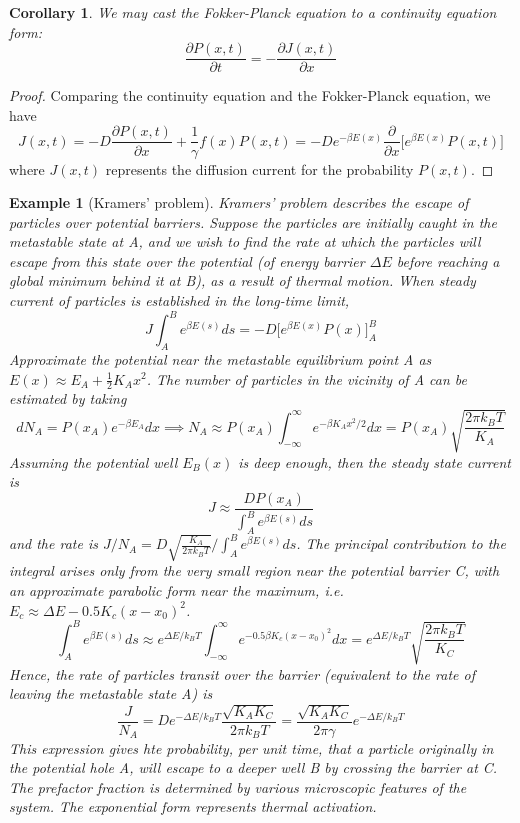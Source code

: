 \documentclass[a4paper]{article}
\newtheorem{eg}{Example}[section]
\theoremstyle{new}
\newtheorem{cor}{Corollary}[section]
\begin{document}
\begin{cor}
We may cast the Fokker-Planck equation to a continuity equation form:
$$\frac{\partial P(x,t)}{\partial t}=-\frac{\partial J(x,t)}{\partial x}$$
\end{cor}
\begin{proof}
Comparing the continuity equation and the Fokker-Planck equation, we have
$$J(x,t)=-D\frac{\partial P(x,t)}{\partial x}+\frac{1}{\gamma}f(x)P(x,t)=-De^{-\beta E(x)}\frac{\partial}{\partial x}\bigg[e^{\beta E(x)}P(x,t)\bigg]$$
where $J(x,t)$ represents the diffusion current for the probability $P(x,t)$.
\end{proof}
\begin{eg}[Kramers' problem]
Kramers' problem describes the escape of particles over potential barriers. Suppose the particles are initially caught in the metastable state at A, and we wish to find the rate at which the particles will escape from this state over the potential (of energy barrier $\Delta E$ before reaching a global minimum behind it at B), as a result of thermal motion. When steady current of particles is established in the long-time limit,
$$J\int_A^Be^{\beta E(s)}ds=-D\bigg[e^{\beta E(x)}P(x)\bigg]_A^B$$
Approximate the potential near the metastable equilibrium point A as $E(x)\approx E_A+\frac{1}{2}K_Ax^2$. The number of particles in the vicinity of A can be estimated by taking
$$dN_A=P(x_A)e^{-\beta E_A}dx\implies N_A\approx P(x_A)\int_{-\infty}^\infty e^{-\beta K_Ax^2/2}dx=P(x_A)\sqrt{\frac{2\pi k_BT}{K_A}}$$
Assuming the potential well $E_B(x)$ is deep enough, then the steady state current is
$$J\approx\frac{DP(x_A)}{\int_A^Be^{\beta E(s)}ds}$$
and the rate is $J/N_A=D\sqrt{\frac{K_A}{2\pi k_BT}}/\int_A^Be^{\beta E(s)}ds$. The principal contribution to the integral arises only from the very small region near the potential barrier C, with an approximate parabolic form near the maximum, i.e. $E_c\approx\Delta E-0.5K_c(x-x_0)^2$.
$$\int_A^Be^{\beta E(s)}ds\approx e^{\Delta E/k_BT}\int_{-\infty}^\infty e^{-0.5\beta K_c(x-x_0)^2}dx=e^{\Delta E/k_BT}\sqrt{\frac{2\pi k_BT}{K_C}}$$
Hence, the rate of particles transit over the barrier (equivalent to the rate of leaving the metastable state A) is
$$\frac{J}{N_A}=De^{-\Delta E/k_BT}\frac{\sqrt{K_AK_C}}{2\pi k_BT}=\frac{\sqrt{K_AK_C}}{2\pi\gamma}e^{-\Delta E/k_BT}$$
This expression gives hte probability, per unit time, that a particle originally in the potential hole A, will escape to a deeper well B by crossing the barrier at C. The prefactor fraction is determined by various microscopic features of the system. The exponential form represents thermal activation.
\end{eg}
\newpage
\end{document}
